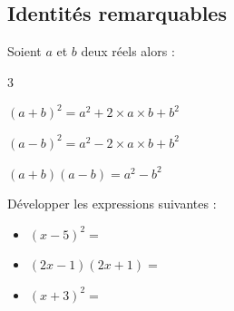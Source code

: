 \newpage

\subsection{Identités remarquables}

\begin{Théorème}
Soient $a$ et $b$ deux réels alors : 
\vspace{-0.5cm}
\begin{multicols}{3}
\begin{itemize}[label=\textcolor{Couleur1}{$\bullet$}]
\begin{large}
\item $(a+b)^2=a^2+2\times a \times b+b^2$
\item $(a-b)^2=a^2-2\times a \times b+b^2$
\item $(a+b)(a-b)=a^2 - b^2$
\end{large}
\end{itemize}
\end{multicols}
\vspace{0.2cm}
\end{Théorème}

\begin{Exemple}
Développer les expressions suivantes :

\begin{itemize}[label=\textcolor{Couleur8}{$\bullet$}]
\item $(x-5)^2 =$ \ligne
\item  $(2x-1)(2x+1)=$ \ligne
\item $(x+3)^2=$ \ligne
\end{itemize}


\end{Exemple}


